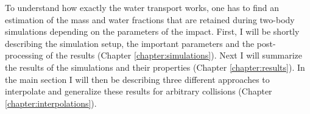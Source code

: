 
To understand how exactly the water transport works, one has to find an estimation of the mass and water fractions that are retained during two-body simulations depending on the parameters of the impact.
First, I will be shortly describing the simulation setup, the important parameters and the post-processing of the results (Chapter \ref{chapter:simulations}). Next I will summarize the results of the simulations and their properties (Chapter \ref{chapter:results}). In the main section I will then be describing three different approaches to interpolate and generalize these results for arbitrary collisions (Chapter \ref{chapter:interpolations}). 